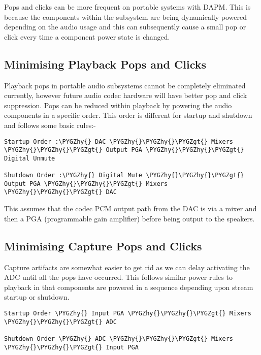 \documentclass[a4paper,8pt,english]{sphinxmanual}
\def\PYGZgt{\char`\>}
\def\PYGZhy{\char`\-}
\begin{document}
Pops and clicks can be more frequent on portable systems with DAPM. This is
because the components within the subsystem are being dynamically powered
depending on the audio usage and this can subsequently cause a small pop or
click every time a component power state is changed.


\subsection{Minimising Playback Pops and Clicks}
\label{sound/soc/pops-clicks:minimising-playback-pops-and-clicks}
Playback pops in portable audio subsystems cannot be completely eliminated
currently, however future audio codec hardware will have better pop and click
suppression.  Pops can be reduced within playback by powering the audio
components in a specific order. This order is different for startup and
shutdown and follows some basic rules:-

\begin{Verbatim}[commandchars=\\\{\}]
Startup Order :\PYGZhy{} DAC \PYGZhy{}\PYGZhy{}\PYGZgt{} Mixers \PYGZhy{}\PYGZhy{}\PYGZgt{} Output PGA \PYGZhy{}\PYGZhy{}\PYGZgt{} Digital Unmute

Shutdown Order :\PYGZhy{} Digital Mute \PYGZhy{}\PYGZhy{}\PYGZgt{} Output PGA \PYGZhy{}\PYGZhy{}\PYGZgt{} Mixers \PYGZhy{}\PYGZhy{}\PYGZgt{} DAC
\end{Verbatim}

This assumes that the codec PCM output path from the DAC is via a mixer and then
a PGA (programmable gain amplifier) before being output to the speakers.


\subsection{Minimising Capture Pops and Clicks}
\label{sound/soc/pops-clicks:minimising-capture-pops-and-clicks}
Capture artifacts are somewhat easier to get rid as we can delay activating the
ADC until all the pops have occurred. This follows similar power rules to
playback in that components are powered in a sequence depending upon stream
startup or shutdown.

\begin{Verbatim}[commandchars=\\\{\}]
Startup Order \PYGZhy{} Input PGA \PYGZhy{}\PYGZhy{}\PYGZgt{} Mixers \PYGZhy{}\PYGZhy{}\PYGZgt{} ADC

Shutdown Order \PYGZhy{} ADC \PYGZhy{}\PYGZhy{}\PYGZgt{} Mixers \PYGZhy{}\PYGZhy{}\PYGZgt{} Input PGA
\end{Verbatim}
\end{document}
